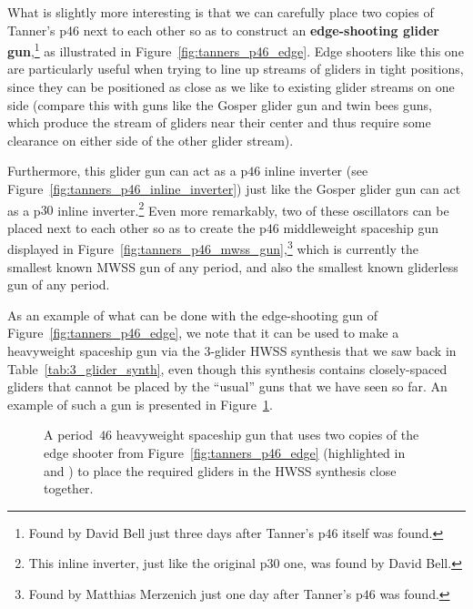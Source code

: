 What is slightly more interesting is that we can carefully place two copies of Tanner's p46 next to each other so as to construct an \textbf{edge-shooting glider gun},\footnote{Found by David Bell just three days after Tanner's p$46$ itself was found.} as illustrated in Figure~\ref{fig:tanners_p46_edge}. Edge shooters like this one are particularly useful when trying to line up streams of gliders in tight positions, since they can be positioned as close as we like to existing glider streams on one side (compare this with guns like the Gosper glider gun and twin bees guns, which produce the stream of gliders near their center and thus require some clearance on either side of the other glider stream).

Furthermore, this glider gun can act as a p$46$ inline inverter (see Figure~\ref{fig:tanners_p46_inline_inverter}) just like the Gosper glider gun can act as a p$30$ inline inverter.\footnote{This inline inverter, just like the original p$30$ one, was found by David Bell.} Even more remarkably, two of these oscillators can be placed next to each other so as to create the p$46$ middleweight spaceship gun displayed in Figure~\ref{fig:tanners_p46_mwss_gun},\footnote{Found by Matthias Merzenich just one day after Tanner's p$46$ was found.} which is currently the smallest known MWSS gun of any period, and also the smallest known gliderless gun of any period.

As an example of what can be done with the edge-shooting gun of Figure~\ref{fig:tanners_p46_edge}, we note that it can be used to make a heavyweight spaceship gun via the $3$-glider HWSS synthesis that we saw back in Table~\ref{tab:3_glider_synth}, even though this synthesis contains closely-spaced gliders that cannot be placed by the ``usual'' guns that we have seen so far. An example of such a gun is presented in Figure~\ref{fig:p46_hwss_gun}.

\begin{figure}[!htb]
	\centering
	\caption{A period~$46$ heavyweight spaceship gun that uses two copies of the edge shooter from Figure~\ref{fig:tanners_p46_edge} (highlighted in  and ) to place the required gliders in the HWSS synthesis close together.}
	\label{fig:p46_hwss_gun}
\end{figure}


